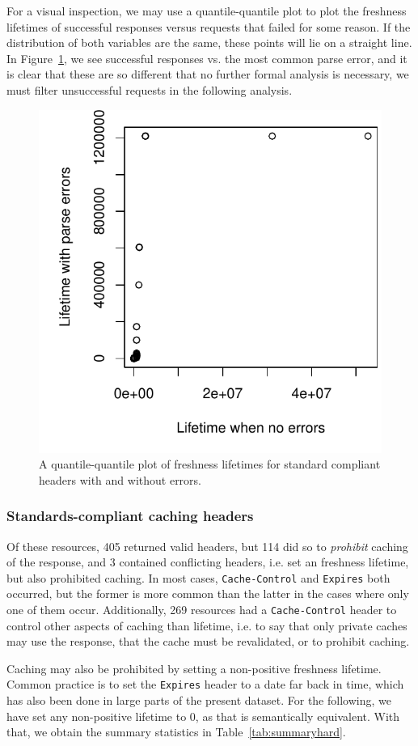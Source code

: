 \documentclass{llncs}
\newcommand{\httph}[1]{\texttt{#1}}
\begin{document}
For a visual inspection, we may use a quantile-quantile plot to plot
the freshness lifetimes of successful responses versus requests that
failed for some reason. If the distribution of both variables are the
same, these points will lie on a straight line. In
Figure~\ref{fig:errorsqq}, we see successful responses vs. the most
common parse error, and it is clear that these are so different that
no further formal analysis is necessary, we must filter unsuccessful
requests in the following analysis.


\begin{figure}[ht!]
  \centerline{%
    \includegraphics[width=.5\textwidth]{errorsqq.pdf}}
  \caption{A quantile-quantile plot of freshness lifetimes for
    standard compliant headers with and without errors.}
  \label{fig:errorsqq}
\end{figure}


\subsubsection{Standards-compliant caching headers}

Of these resources, 405 returned valid headers, but 114 did so to
\emph{prohibit} caching of the response, and 3 contained conflicting
headers, i.e. set an freshness lifetime, but also prohibited
caching. In most cases, \httph{Cache-Control} and \httph{Expires} both
occurred, but the former is more common than the latter in the cases
where only one of them occur.  Additionally, 269 resources had a
\httph{Cache-Control} header to control other aspects of caching than
lifetime, i.e. to say that only private caches may use the response,
that the cache must be revalidated, or to prohibit caching.

Caching may also be prohibited by setting a non-positive freshness
lifetime. Common practice is to set the \httph{Expires} header to a
date far back in time, which has also been done in large parts of the
present dataset. For the following, we have set any non-positive
lifetime to 0, as that is semantically equivalent. With that, we
obtain the summary statistics in Table~\ref{tab:summaryhard}. 
\end{document}
